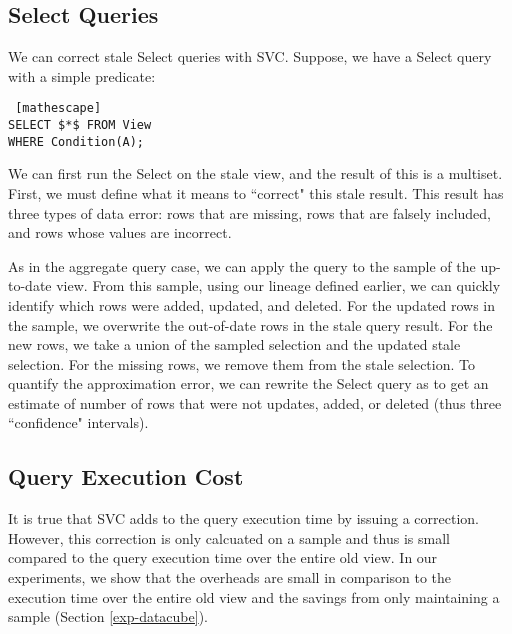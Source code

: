 \subsection{Select Queries}
We can correct stale Select queries with SVC.
Suppose, we have a Select query with a simple predicate:
\begin{lstlisting} [mathescape]
SELECT $*$ FROM View 
WHERE Condition(A);
\end{lstlisting}

We can first run the Select on the stale view, and the result of this is a multiset.
First, we must define what it means to ``correct" this stale result.
This result has three types of data error: rows that are missing, rows that are falsely included, and rows whose values are incorrect.

As in the aggregate query case, we can apply the query to the sample of the up-to-date view.
From this sample, using our lineage defined earlier, we can quickly identify which rows were added, updated, and deleted.
For the updated rows in the sample, we overwrite the out-of-date rows in the stale query result.
For the new rows, we take a union of the sampled selection and the updated stale selection.
For the missing rows, we remove them from the stale selection.
To quantify the approximation error, we can rewrite the Select query as \countfunc to get an estimate of number of rows that were not updates, added, or deleted (thus three ``confidence" intervals). 

\subsection{Query Execution Cost}
It is true that SVC adds to the query execution time by issuing a correction. 
However, this correction is only calcuated on a sample and thus is small compared to the query execution time over the entire old view.
In our experiments, we show that the overheads are small in comparison to the execution time over the entire old view and the savings from only maintaining a sample (Section \ref{exp-datacube}).
